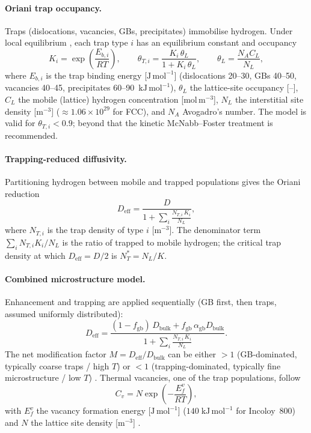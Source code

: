 \documentclass[11pt,a4paper]{article}
\newcommand{\Deff}{D_{\mathrm{eff}}}
\newcommand{\fgb}{f_{\mathrm{gb}}}
\begin{document}
\paragraph{Oriani trap occupancy.} Traps (dislocations, vacancies, GBs,
precipitates) immobilise hydrogen. Under local equilibrium
\citep{oriani1970}, each trap type $i$ has an equilibrium constant and
occupancy
\begin{equation}
  K_i = \exp\!\left(\frac{E_{b,i}}{RT}\right), \qquad
  \theta_{T,i} = \frac{K_i\,\theta_L}{1 + K_i\,\theta_L}, \qquad
  \theta_L = \frac{N_A C_L}{N_L},
  \label{eq:orianitheta}
\end{equation}
where $E_{b,i}$ is the trap binding energy [$\mathrm{J\,mol^{-1}}$]
(dislocations 20--30, GBs 40--50, vacancies 40--45, precipitates
60--90~$\mathrm{kJ\,mol^{-1}}$), $\theta_L$ the lattice-site occupancy [--],
$C_L$ the mobile (lattice) hydrogen concentration [$\mathrm{mol\,m^{-3}}$],
$N_L$ the interstitial site density [$\mathrm{m^{-3}}$]
($\approx 1.06\times10^{29}$ for FCC), and $N_A$ Avogadro's number. The model
is valid for $\theta_{T,i} < 0.9$; beyond that the kinetic McNabb--Foster
treatment \citep{mcnabb1963} is recommended.

\paragraph{Trapping-reduced diffusivity.} Partitioning hydrogen between mobile
and trapped populations gives the Oriani reduction
\begin{equation}
  \Deff = \frac{D}{1 + \displaystyle\sum_i \frac{N_{T,i}\,K_i}{N_L}},
  \label{eq:orianiDeff}
\end{equation}
where $N_{T,i}$ is the trap density of type $i$ [$\mathrm{m^{-3}}$]. The
denominator term $\sum_i N_{T,i}K_i/N_L$ is the ratio of trapped to mobile
hydrogen; the critical trap density at which $\Deff = D/2$ is
$N_T^{*} = N_L/K$.

\paragraph{Combined microstructure model.} Enhancement and trapping are
applied sequentially (GB first, then traps, assumed uniformly distributed):
\begin{equation}
  \Deff = \frac{(1-\fgb)\,D_{\mathrm{bulk}} + \fgb\,\alpha_{\mathrm{gb}} D_{\mathrm{bulk}}}
               {1 + \displaystyle\sum_i \frac{N_{T,i}\,K_i}{N_L}}.
  \label{eq:combined}
\end{equation}
The net modification factor $M = \Deff/D_{\mathrm{bulk}}$ can be either
$>1$ (GB-dominated, typically coarse traps / high $T$) or $<1$
(trapping-dominated, typically fine microstructure / low $T$)
\citep{oudriss2012}. Thermal vacancies, one of the trap populations, follow
\begin{equation}
  C_v = N \exp\!\left(-\frac{E_f^{v}}{RT}\right),
  \label{eq:vacancy}
\end{equation}
with $E_f^{v}$ the vacancy formation energy [$\mathrm{J\,mol^{-1}}$]
($140\;\mathrm{kJ\,mol^{-1}}$ for Incoloy~800) and $N$ the lattice site
density [$\mathrm{m^{-3}}$] \citep{kraftmakher1998}.
\end{document}
